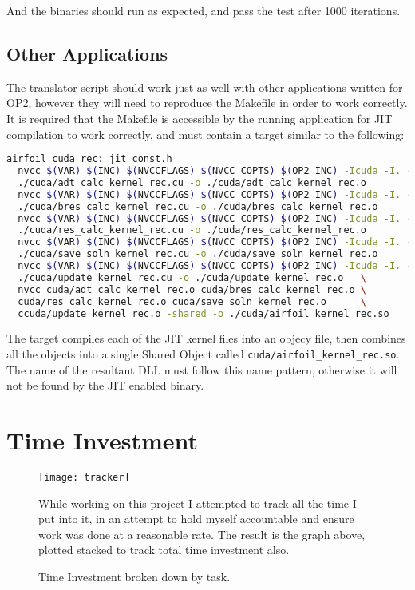 \noindent And the binaries should run as expected, and pass the test after 1000 iterations.

\subsection{Other Applications}
The translator script should work just as well with other applications written for OP2, however they will need to reproduce the Makefile in order to work correctly. It is required that the Makefile is accessible by the running application for JIT compilation to work correctly, and must contain a target similar to the following:

\begin{lstlisting}[frame=none, backgroundcolor=\color{white}, language=bash]
airfoil_cuda_rec: jit_const.h
  nvcc $(VAR) $(INC) $(NVCCFLAGS) $(NVCC_COPTS) $(OP2_INC) -Icuda -I. -c \
  ./cuda/adt_calc_kernel_rec.cu -o ./cuda/adt_calc_kernel_rec.o
  nvcc $(VAR) $(INC) $(NVCCFLAGS) $(NVCC_COPTS) $(OP2_INC) -Icuda -I. -c \
  ./cuda/bres_calc_kernel_rec.cu -o ./cuda/bres_calc_kernel_rec.o
  nvcc $(VAR) $(INC) $(NVCCFLAGS) $(NVCC_COPTS) $(OP2_INC) -Icuda -I. -c \
  ./cuda/res_calc_kernel_rec.cu -o ./cuda/res_calc_kernel_rec.o
  nvcc $(VAR) $(INC) $(NVCCFLAGS) $(NVCC_COPTS) $(OP2_INC) -Icuda -I. -c \
  ./cuda/save_soln_kernel_rec.cu -o ./cuda/save_soln_kernel_rec.o
  nvcc $(VAR) $(INC) $(NVCCFLAGS) $(NVCC_COPTS) $(OP2_INC) -Icuda -I. -c \
  ./cuda/update_kernel_rec.cu -o ./cuda/update_kernel_rec.o   \
  nvcc cuda/adt_calc_kernel_rec.o cuda/bres_calc_kernel_rec.o \
  cuda/res_calc_kernel_rec.o cuda/save_soln_kernel_rec.o      \
  ccuda/update_kernel_rec.o -shared -o ./cuda/airfoil_kernel_rec.so
\end{lstlisting}

\noindent The target compiles each of the JIT kernel files into an objecy file, then combines all the objects into a single Shared Object called \verb|cuda/airfoil_kernel_rec.so|. The name of the resultant DLL must follow this name pattern, otherwise it will not be found by the JIT enabled binary.

\clearpage
\section{Time Investment}
\label{app:tracker}
\begin{figure}[h]
\texttt{[image: tracker]}
\caption{\label{fig:tracker}Time Investment broken down by task.}

\vspace{1em}
While working on this project I attempted to track all the time I put into it, in an attempt to hold myself accountable and ensure work was done at a reasonable rate. The result is the graph above, plotted stacked to track total time investment also.
\end{figure}
